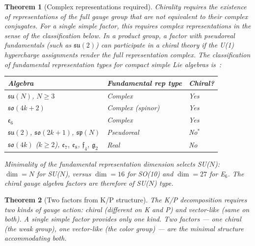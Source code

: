\documentclass[12pt,a4paper]{article}
\newtheorem{theorem}{Theorem}
\begin{document}
\begin{theorem}[Complex representations required]
\label{thm:complex_reps}
Chirality requires the existence of representations of the full gauge group that are not equivalent to their complex conjugates. For a single simple factor, this requires complex representations in the sense of the classification below. In a product group, a factor with pseudoreal fundamentals (such as $\mathfrak{su}(2)$) can participate in a chiral theory if the U(1) hypercharge assignments render the full representation complex. The classification of fundamental representation types for compact simple Lie algebras is~\cite{fultonharris}:

\begin{center}
\begin{tabular}{lll}
\toprule
Algebra & Fundamental rep type & Chiral? \\
\midrule
$\mathfrak{su}(N)$, $N \geq 3$ & Complex & Yes \\
$\mathfrak{so}(4k+2)$ & Complex (spinor) & Yes \\
$\mathfrak{e}_6$ & Complex & Yes \\
$\mathfrak{su}(2)$, $\mathfrak{so}(2k+1)$, $\mathfrak{sp}(N)$ & Pseudoreal & No$^*$ \\
$\mathfrak{so}(4k)$ ($k \geq 2$), $\mathfrak{e}_7$, $\mathfrak{e}_8$, $\mathfrak{f}_4$, $\mathfrak{g}_2$ & Real & No \\
\bottomrule
\end{tabular}
\end{center}


Minimality of the fundamental representation dimension selects SU($N$): $\dim = N$ for SU($N$), versus $\dim = 16$ for SO(10) and $\dim = 27$ for E$_6$. The chiral gauge algebra factors are therefore of SU($N$) type.
\end{theorem}

\begin{theorem}[Two factors from K/P structure]
\label{thm:two_factors}
The K/P decomposition requires two kinds of gauge action: chiral (different on K and P) and vector-like (same on both). A single simple factor provides only one kind. Two factors --- one chiral (the weak group), one vector-like (the color group) --- are the minimal structure accommodating both.
\end{theorem}
\end{document}
